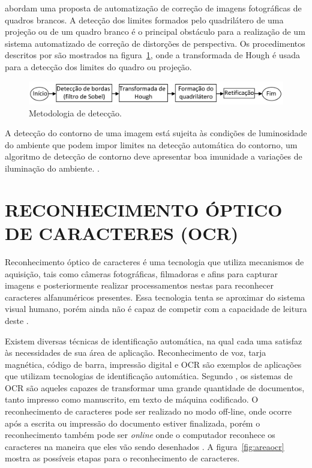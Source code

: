  abordam uma proposta de automatização de correção de imagens fotográficas de quadros brancos. A detecção dos limites formados pelo quadrilátero de uma projeção ou de um quadro branco é o principal obstáculo para a realização de um sistema automatizado de correção de distorções de perspectiva. Os procedimentos descritos por  são mostrados na figura~\ref{fig:metodologiacorrecao}, onde a transformada de Hough é usada para a detecção dos limites do quadro ou projeção.

 \begin{figure}[h]
	\centering
	\includegraphics[width=1.0\textwidth]{Imagens/metodologiacorrecao} 
	\caption[Metodologia de detecção.]{Metodologia de detecção.}
	\label{fig:metodologiacorrecao}
\end{figure}

A detecção do contorno de uma imagem está sujeita às condições de luminosidade do ambiente que podem impor limites na detecção automática do contorno, um algoritmo de detecção de contorno deve apresentar boa imunidade a variações de iluminação do ambiente. \cite{Pereira}.


\section{RECONHECIMENTO ÓPTICO DE CARACTERES (OCR)}
Reconhecimento óptico de caracteres é uma tecnologia que utiliza mecanismos de aquisição, tais como câmeras fotográficas, filmadoras e afins para capturar imagens e posteriormente realizar processamentos nestas para reconhecer caracteres alfanuméricos presentes. Essa tecnologia tenta se aproximar do sistema visual humano, porém ainda não é capaz de competir com a capacidade de leitura deste \cite{Mithe2013}.

 Existem diversas técnicas de identificação automática, na qual cada uma satisfaz às necessidades de sua área de aplicação. Reconhecimento de voz, tarja magnética, código de barra, impressão digital e OCR são exemplos de aplicações que utilizam tecnologias de identificação automática. Segundo , os sistemas de OCR são aqueles capazes de transformar uma grande quantidade de documentos, tanto impresso como manuscrito, em texto de máquina codificado. O reconhecimento de caracteres pode ser realizado no modo off-line, onde ocorre após a escrita ou impressão do documento estiver finalizada, porém o reconhecimento também pode ser \textit{online} onde o computador reconhece os caracteres na maneira que eles vão sendo desenhados \cite{Eikvil1993}. A figura~\ref{fig:areaocr} mostra as possíveis etapas para o reconhecimento de caracteres.

